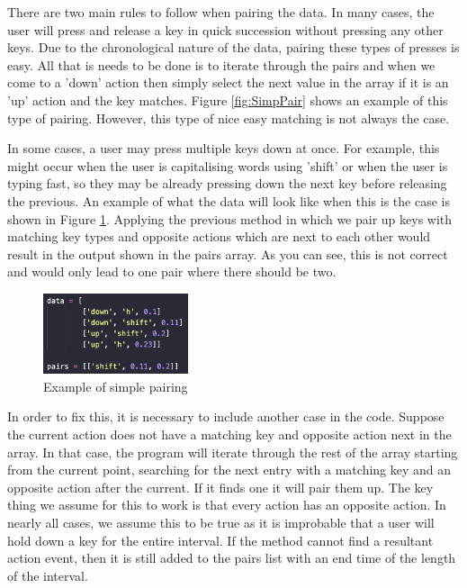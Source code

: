 \documentclass[10pt,a4paper]{report}
\begin{document}
There are two main rules to follow when pairing the data. In many cases, the user will press and release a key in quick succession without pressing any other keys. Due to the chronological nature of the data, pairing these types of presses is easy. All that is needs to be done is to iterate through the pairs and when we come to a 'down' action then simply select the next value in the array if it is an 'up' action and the key matches. Figure \ref{fig:SimpPair} shows an example of this type of pairing. However, this type of nice easy matching is not always the case.

In some cases, a user may press multiple keys down at once. For example, this might occur when the user is capitalising words using 'shift' or when the user is typing fast, so they may be already pressing down the next key before releasing the previous. An example of what the data will look like when this is the case is shown in Figure \ref{fig:WrongPair}. Applying the previous method in which we pair up keys with matching key types and opposite actions which are next to each other would result in the output shown in the pairs array. As you can see, this is not correct and would only lead to one pair where there should be two.

\begin{figure}
	\begin{center}
		\includegraphics[width=0.38\textwidth]{PairingWrong}
	\end{center}
	\caption{Example of simple pairing}
	\label{fig:WrongPair}
\end{figure}

In order to fix this, it is necessary to include another case in the code. Suppose the current action does not have a matching key and opposite action next in the array. In that case, the program will iterate through the rest of the array starting from the current point, searching for the next entry with a matching key and an opposite action after the current. If it finds one it will pair them up. The key thing we assume for this to work is that every action has an opposite action. In nearly all cases, we assume this to be true as it is improbable that a user will hold down a key for the entire interval. If the method cannot find a resultant action event, then it is still added to the pairs list with an end time of the length of the interval.
\end{document}
